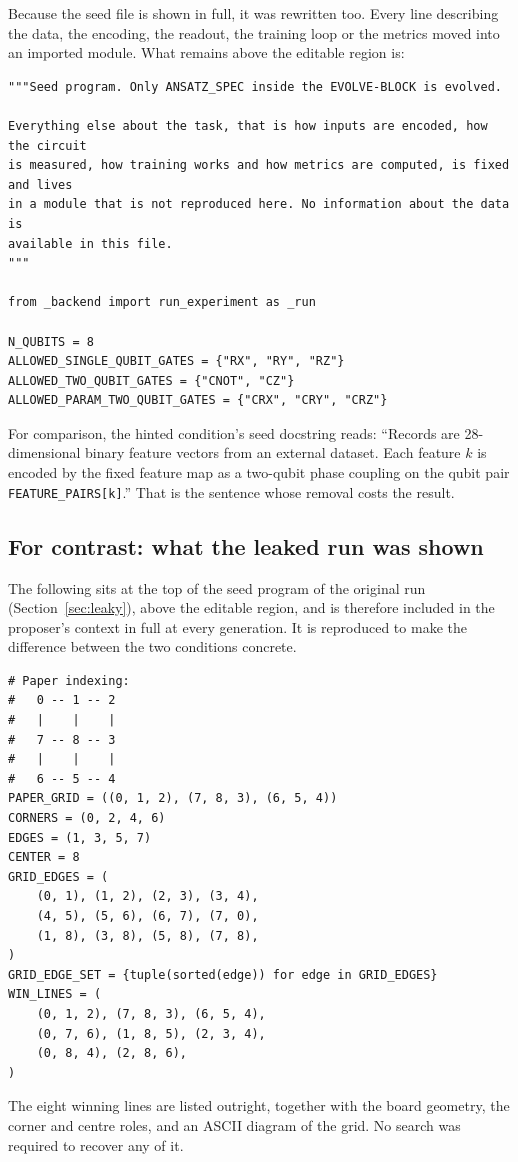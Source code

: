 \noindent Because the seed file is shown in full, it was rewritten too. Every
line describing the data, the encoding, the readout, the training loop or the
metrics moved into an imported module. What remains above the editable region is:

\begin{lstlisting}[style=prompt]
"""Seed program. Only ANSATZ_SPEC inside the EVOLVE-BLOCK is evolved.

Everything else about the task, that is how inputs are encoded, how the circuit
is measured, how training works and how metrics are computed, is fixed and lives
in a module that is not reproduced here. No information about the data is
available in this file.
"""

from _backend import run_experiment as _run

N_QUBITS = 8
ALLOWED_SINGLE_QUBIT_GATES = {"RX", "RY", "RZ"}
ALLOWED_TWO_QUBIT_GATES = {"CNOT", "CZ"}
ALLOWED_PARAM_TWO_QUBIT_GATES = {"CRX", "CRY", "CRZ"}
\end{lstlisting}

\noindent For comparison, the hinted condition's seed docstring reads: ``Records
are 28-dimensional binary feature vectors from an external dataset. Each feature
$k$ is encoded by the fixed feature map as a two-qubit phase coupling on the
qubit pair \texttt{FEATURE\_PAIRS[k]}.'' That is the sentence whose removal
costs the result.

\subsection{For contrast: what the leaked run was shown}

The following sits at the top of the seed program of the original run
(Section~\ref{sec:leaky}), above the editable region, and is therefore included
in the proposer's context in full at every generation. It is reproduced to make
the difference between the two conditions concrete.

\begin{lstlisting}[style=prompt]
# Paper indexing:
#   0 -- 1 -- 2
#   |    |    |
#   7 -- 8 -- 3
#   |    |    |
#   6 -- 5 -- 4
PAPER_GRID = ((0, 1, 2), (7, 8, 3), (6, 5, 4))
CORNERS = (0, 2, 4, 6)
EDGES = (1, 3, 5, 7)
CENTER = 8
GRID_EDGES = (
    (0, 1), (1, 2), (2, 3), (3, 4),
    (4, 5), (5, 6), (6, 7), (7, 0),
    (1, 8), (3, 8), (5, 8), (7, 8),
)
GRID_EDGE_SET = {tuple(sorted(edge)) for edge in GRID_EDGES}
WIN_LINES = (
    (0, 1, 2), (7, 8, 3), (6, 5, 4),
    (0, 7, 6), (1, 8, 5), (2, 3, 4),
    (0, 8, 4), (2, 8, 6),
)
\end{lstlisting}

\noindent The eight winning lines are listed outright, together with the board
geometry, the corner and centre roles, and an ASCII diagram of the grid. No
search was required to recover any of it.
